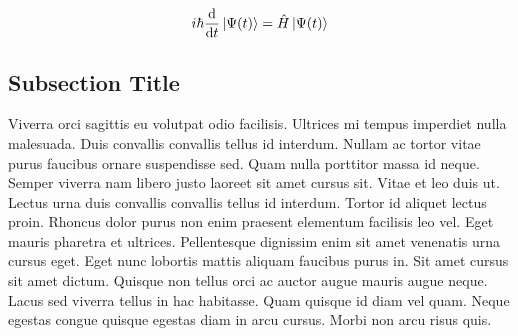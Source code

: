 \documentclass[10pt,letterpaper,twocolumn]{article}
\begin{document}
\begin{align}
  i\hbar\dv{t}\ket{\Psi(t)} = \hat{H}\ket{\Psi(t)}
\end{align}

\subsection{Subsection Title}

Viverra orci sagittis eu volutpat odio facilisis. Ultrices mi tempus imperdiet nulla malesuada. Duis convallis convallis tellus id interdum. Nullam ac tortor vitae purus faucibus ornare suspendisse sed. Quam nulla porttitor massa id neque. Semper viverra nam libero justo laoreet sit amet cursus sit. Vitae et leo duis ut. Lectus urna duis convallis convallis tellus id interdum. Tortor id aliquet lectus proin. Rhoncus dolor purus non enim praesent elementum facilisis leo vel. Eget mauris pharetra et ultrices. Pellentesque dignissim enim sit amet venenatis urna cursus eget. Eget nunc lobortis mattis aliquam faucibus purus in. Sit amet cursus sit amet dictum. Quisque non tellus orci ac auctor augue mauris augue neque. Lacus sed viverra tellus in hac habitasse. Quam quisque id diam vel quam. Neque egestas congue quisque egestas diam in arcu cursus. Morbi non arcu risus quis.\autocites[Lorem ipsum...][]{article-one}{article-two}
\end{document}
